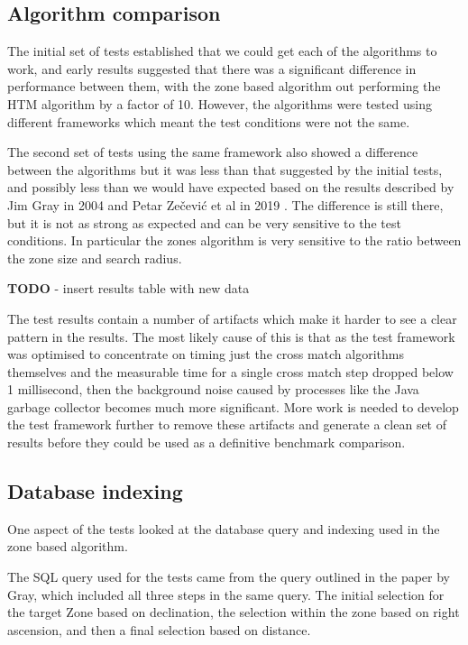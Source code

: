\documentclass{article}
\begin{document}
\subsection{Algorithm comparison}
\label{algorithm-comparison}

The initial set of tests established that we could get each of the algorithms to work, and early results suggested that there was a significant difference in performance between them, with the zone based algorithm out performing the HTM algorithm by a factor of 10. However, the algorithms were tested using different frameworks which meant the test conditions were not the same.

The second set of tests using the same framework also showed a difference between the algorithms but it was less than that suggested by the initial tests, and possibly less than we would have expected based on the results described by Jim Gray in 2004 \cite{Gray-2004} and Petar Zečević et al in 2019 \cite{Zecevic-2019}.
The difference is still there, but it is not as strong as expected and can be very sensitive to the test conditions. In particular the zones algorithm is very sensitive to the ratio between the zone size and search radius.

\textbf{TODO} - insert results table with new data

The test results contain a number of artifacts which make it harder to see a clear pattern in the results. The most likely cause of this is that as the test framework was optimised to concentrate on timing just the cross match algorithms themselves and the measurable time for a single cross match step dropped below 1 millisecond, then the background noise caused by processes like the Java garbage collector becomes much more significant.
More work is needed to develop the test framework further to remove these artifacts and generate a clean set of results before they could be used as a definitive benchmark comparison.

\subsection{Database indexing}
\label{database-indexing}

One aspect of the tests looked at the database query and indexing used in the zone based algorithm.

The SQL query used for the tests came from the query outlined in the paper by Gray, which included all three steps in the same query. The initial selection for the target Zone based on declination, the selection within the zone based on right ascension, and then a final selection based on distance.
\end{document}

